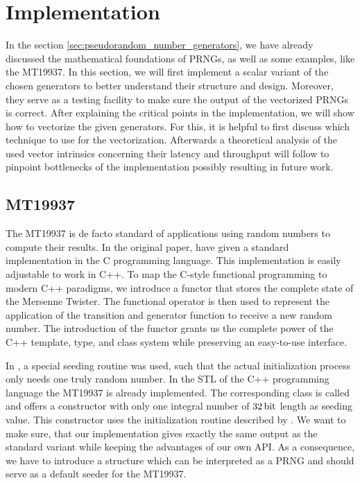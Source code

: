 \documentclass{stdlocal}
\begin{document}
\section{Implementation} %
\label{sec:implementation}
  In the section \ref{sec:pseudorandom_number_generators}, we have already discussed the mathematical foundations of PRNGs, as well as some examples, like the MT19937.
  In this section, we will first implement a scalar variant of the chosen generators to better understand their structure and design.
  Moreover, they serve as a testing facility to make sure the output of the vectorized PRNGs is correct.
  After explaining the critical points in the implementation, we will show how to vectorize the given generators.
  For this, it is helpful to first discuss which technique to use for the vectorization.
  Afterwards a theoretical analysis of the used vector intrinsics concerning their latency and throughput will follow to pinpoint bottlenecks of the implementation possibly resulting in future work.

  \subsection{MT19937} %
  \label{sub:mersenne_twister}
    The MT19937 is de facto standard of applications using random numbers to compute their results.
    In the original paper, \citeauthor{matsumoto1998} have given a standard implementation in the C programming language.
    This implementation is easily adjustable to work in C++.
    To map the C-style functional programming to modern C++ paradigms, we introduce a functor that stores the complete state of the Mersenne Twister.
    The functional operator is then used to represent the application of the transition and generator function to receive a new random number.
    The introduction of the functor grants us the complete power of the C++ template, type, and class system while preserving an easy-to-use interface.

    In \textcite{kneusel2018}, a special seeding routine was used, such that the actual initialization process only needs one truly random number.
    In the STL of the C++ programming language the MT19937 is already implemented.
    The corresponding class is called  and offers a constructor with only one integral number of $32\, \mathrm{bit}$ length as seeding value.
    This constructor uses the initialization routine described by \textcite{kneusel2018}.
    We want to make sure, that our implementation gives exactly the same output as the standard variant while keeping the advantages of our own API.
    As a consequence, we have to introduce a structure which can be interpreted as a PRNG and should serve as a default seeder for the MT19937.
\end{document}
